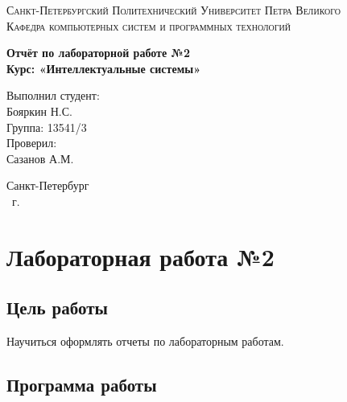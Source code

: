 \documentclass[14pt,a4paper,report]{report}
\begin{document}
\def\contentsname{Содержание}

\begin{titlepage}
	\begin{center}
		\textsc{Санкт-Петербургский Политехнический 
			Университет Петра Великого\\[5mm]
			Кафедра компьютерных систем и программных технологий}
		
		\vfill
		
		\textbf{Отчёт по лабораторной работе №2\\[3mm]
			Курс: «Интеллектуальные системы»\\[41mm]
		}
	\end{center}
	
	\hfill
	\begin{minipage}{.4\textwidth}
		Выполнил студент:\\[2mm] 
		Бояркин Н.С.\\
		Группа: 13541/3\\[5mm]
		
		Проверил:\\[2mm] 
		Сазанов А.М.
	\end{minipage}
	\vfill
	\begin{center}
		Санкт-Петербург\\ \the\year\ г.
	\end{center}
\end{titlepage}

\tableofcontents
\clearpage

\chapter{Лабораторная работа №2}

\section{Цель работы}

Научиться оформлять отчеты по лабораторным работам.

\section{Программа работы}
\end{document}
